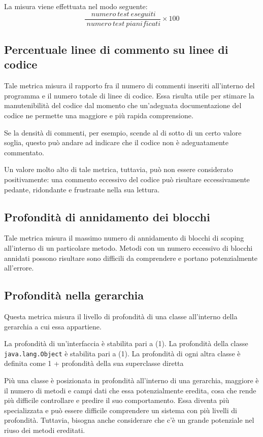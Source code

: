 La misura viene effettuata nel modo seguente:
\begin{equation}
	\frac{~numero~test~eseguiti}{~numero~test~pianificati}\times{100}
\end{equation}

\subsection{Percentuale linee di commento su linee di codice}
Tale metrica misura il rapporto fra il numero di commenti inseriti all'interno del programma e il numero totale di linee di codice. Essa risulta utile per stimare la manutenibilità del codice dal momento che un'adeguata documentazione del codice ne permette una maggiore e più rapida comprensione.

Se la densità di commenti, per esempio, scende al di sotto di un certo valore soglia, questo può andare ad indicare che il codice non è adeguatamente commentato.

Un valore molto alto di tale metrica, tuttavia, può non essere considerato positivamente: una commento eccessivo del codice può risultare eccessivamente pedante, ridondante e frustrante nella sua lettura.

\subsection{Profondità di annidamento dei blocchi}
Tale metrica misura il massimo numero di annidamento di blocchi di scoping all'interno di un particolare metodo. Metodi con un numero eccessivo di blocchi annidati possono risultare sono difficili da comprendere e portano potenzialmente all'errore.

\subsection{Profondità nella gerarchia}
Questa metrica misura il livello di profondità di una classe all'interno della gerarchia a cui essa appartiene. 

La profondità di un'interfaccia è stabilita pari a (1). La profondità della classe \texttt{java.lang.Object} è stabilita pari a (1). La profondità di ogni altra classe è definita come 1 + profondità della sua superclasse diretta

Più una classe è posizionata in profondità all'interno di una gerarchia, maggiore è il numero di metodi e campi dati che essa potenzialmente eredita, cosa che rende più difficile controllare e predire il suo comportamento. Essa diventa più specializzata e può essere difficile comprendere un sistema con più livelli di profondità. Tuttavia, bisogna anche considerare che c'è un grande potenziale nel riuso dei metodi ereditati.

